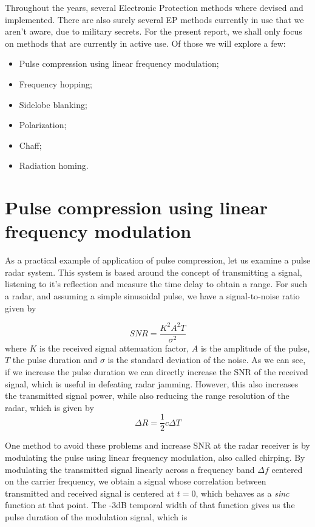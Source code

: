 \documentclass[english,purist]{ist-report}
\begin{document}
Throughout the years, several Electronic Protection methods where devised and implemented. There are also surely several EP methods currently in use that we aren't aware, due to military secrets. For the present report, we shall only focus on methods that are currently in active use. Of those we will explore a few:
\begin{itemize}
    \item Pulse compression using linear frequency modulation;
    \item Frequency hopping;
    \item Sidelobe blanking;
    \item Polarization;
    \item Chaff;
    \item Radiation homing.
\end{itemize}

\section{Pulse compression using linear frequency modulation}

As a practical example of application of pulse compression, let us examine a pulse radar system. This system is based around the concept of transmitting a signal, listening to it's reflection and measure the time delay to obtain a range. For such a radar, and assuming a simple sinusoidal pulse, we have a signal-to-noise ratio given by 

$$
SNR = \frac{K^2 A^2 T}{\sigma^2}
$$
where $K$ is the received signal attenuation factor, $A$ is the amplitude of the pulse, $T$ the pulse duration and $\sigma$ is the standard deviation of the noise. As we can see, if we increase the pulse duration we can directly increase the SNR of the received signal, which is useful in defeating radar jamming. However, this also increases the transmitted signal power, while also reducing the range resolution of the radar, which is given by
$$
\Delta R = \frac{1}{2} c \Delta T
$$

One method to avoid these problems and increase SNR at the radar receiver is by modulating the pulse using linear frequency modulation, also called chirping. By modulating the transmitted signal linearly across a frequency band $\Delta f$ centered on the carrier frequency, we obtain a signal whose correlation between transmitted and received signal is centered at $t = 0$, which behaves as a \textit{sinc} function at that point. The -3dB temporal width of that function gives us the pulse duration of the modulation signal, which is
\end{document}
